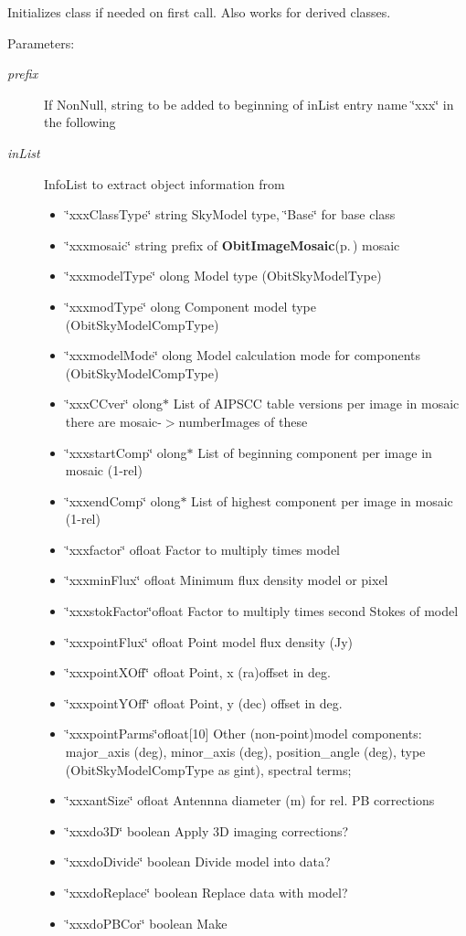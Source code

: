 Initializes class if needed on first call. Also works for derived classes. \begin{Desc}
\item[Parameters:]
\begin{description}
\item[{\em prefix}]If Non\-Null, string to be added to beginning of in\-List entry name \char`\"{}xxx\char`\"{} in the following \item[{\em in\-List}]Info\-List to extract object information from \begin{itemize}
\item \char`\"{}xxx\-Class\-Type\char`\"{} string Sky\-Model type, \char`\"{}Base\char`\"{} for base class \item \char`\"{}xxxmosaic\char`\"{} string prefix of {\bf Obit\-Image\-Mosaic}{\rm (p.\,\pageref{structObitImageMosaic})} mosaic \item \char`\"{}xxxmodel\-Type\char`\"{} olong Model type (Obit\-Sky\-Model\-Type) \item \char`\"{}xxxmod\-Type\char`\"{} olong Component model type (Obit\-Sky\-Model\-Comp\-Type) \item \char`\"{}xxxmodel\-Mode\char`\"{} olong Model calculation mode for components (Obit\-Sky\-Model\-Comp\-Type) \item \char`\"{}xxx\-CCver\char`\"{} olong$\ast$ List of AIPSCC table versions per image in mosaic there are mosaic-$>$number\-Images of these \item \char`\"{}xxxstart\-Comp\char`\"{} olong$\ast$ List of beginning component per image in mosaic (1-rel) \item \char`\"{}xxxend\-Comp\char`\"{} olong$\ast$ List of highest component per image in mosaic (1-rel) \item \char`\"{}xxxfactor\char`\"{} ofloat Factor to multiply times model \item \char`\"{}xxxmin\-Flux\char`\"{} ofloat Minimum flux density model or pixel \item \char`\"{}xxxstok\-Factor\char`\"{}ofloat Factor to multiply times second Stokes of model \item \char`\"{}xxxpoint\-Flux\char`\"{} ofloat Point model flux density (Jy) \item \char`\"{}xxxpoint\-XOff\char`\"{} ofloat Point, x (ra)offset in deg. \item \char`\"{}xxxpoint\-YOff\char`\"{} ofloat Point, y (dec) offset in deg. \item \char`\"{}xxxpoint\-Parms\char`\"{}ofloat[10] Other (non-point)model components: major\_\-axis (deg), minor\_\-axis (deg), position\_\-angle (deg), type (Obit\-Sky\-Model\-Comp\-Type as gint), spectral terms; \item \char`\"{}xxxant\-Size\char`\"{} ofloat Antennna diameter (m) for rel. PB corrections \item \char`\"{}xxxdo3D\char`\"{} boolean Apply 3D imaging corrections? \item \char`\"{}xxxdo\-Divide\char`\"{} boolean Divide model into data? \item \char`\"{}xxxdo\-Replace\char`\"{} boolean Replace data with model? \item \char`\"{}xxxdo\-PBCor\char`\"{} boolean Make 
\end{itemize}
\end{description}
\end{Desc}
